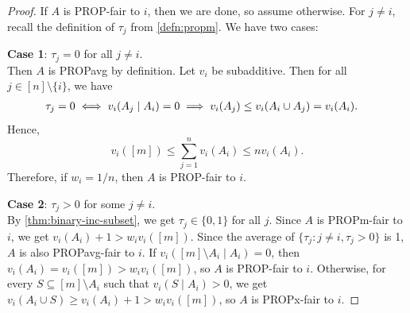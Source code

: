 \begin{proof}
If $A$ is PROP-fair to $i$, then we are done, so assume otherwise.
For $j \neq i$, recall the definition of $\tau_j$ from \cref{defn:propm}.
We have two cases:

\textbf{Case 1}: $\tau_j = 0$ for all $j \neq i$.
\\ Then $A$ is PROPavg by definition. Let $v_i$ be subadditive.
Then for all $j \in [n] \setminus \{i\}$, we have
\begin{align*}
\tau_j = 0 &\iff v_i(A_j \mid A_i) = 0
    \relax\implies v_i(A_j) \le v_i(A_i \cup A_j) = v_i(A_i).
\end{align*}
Hence,
\[ v_i([m]) \le \sum_{j=1}^n v_i(A_i) \le nv_i(A_i). \]
Therefore, if $w_i = 1/n$, then $A$ is PROP-fair to $i$.

\textbf{Case 2}: $\tau_j > 0$ for some $j \neq i$.
\\ By \cref{thm:binary-inc-subset}, we get $\tau_j \in \{0, 1\}$ for all $j$.
Since $A$ is PROPm-fair to $i$, we get $v_i(A_i) + 1 > w_iv_i([m])$.
Since the average of $\{\tau_j: j \neq i, \tau_j > 0\}$ is 1, $A$ is also PROPavg-fair to $i$.
If $v_i([m] \setminus A_i \mid A_i) = 0$, then $v_i(A_i) = v_i([m]) > w_iv_i([m])$, so $A$ is PROP-fair to $i$.
Otherwise, for every $S \subseteq [m] \setminus A_i$ such that $v_i(S \mid A_i) > 0$,
we get $v_i(A_i \cup S) \ge v_i(A_i) + 1 > w_iv_i([m])$, so $A$ is PROPx-fair to $i$.
\end{proof}

